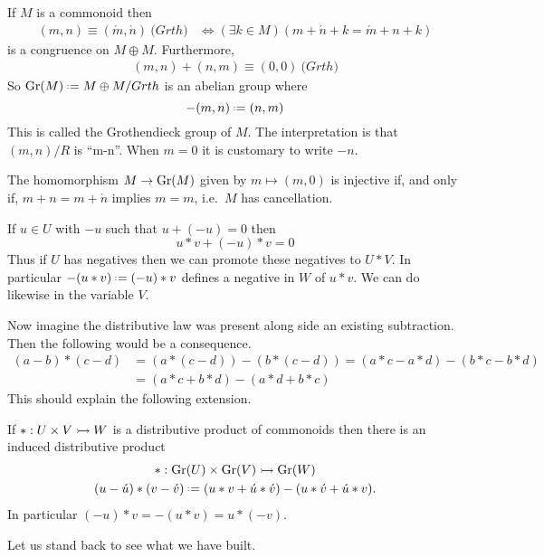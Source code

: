 \begin{theorem}
    If $M$ is a commonoid then 
    \begin{align*}
        (m,n) \equiv (\acute{m},\acute{n}) \pod{Grth} & \Leftrightarrow (\exists k\in M)(m+\acute{n}+k=\acute{m}+n+k)
    \end{align*}
    is a congruence on $M\oplus M$.  Furthermore,
    \begin{align*}
        (m,n)+(n,m) \equiv (0,0) \pod{Grth}
    \end{align*}
    So $\Gr(M)\defeq M\oplus M/Grth$ is an abelian group where 
    \[
        -(m,n)\defeq (n,m)
    \]
    This is called the Grothendieck group of $M$.
    The interpretation is that $(m,n)/R$ is ``m-n''.  When $m=0$ it is customary to write $-n$.

    The homomorphism $M\to \operatorname{Gr}(M)$ given by $m\mapsto (m,0)$ is injective 
    if, and only if, $m+n=m+\acute{n}$ implies $m=m$, i.e.\ $M$ has cancellation.
\end{theorem}

\begin{proposition}
    If $u\in U$ with $-u$ such that $u+(-u)=0$ then 
    \[
        u*v + (-u)*v =0
    \]
    Thus if $U$ has negatives then we can promote these negatives to $U*V$.
    In particular $-(u*v)\defeq (-u)*v$ defines a negative in $W$ of $u*v$.
    We can do likewise in the variable $V$.  
\end{proposition}
Now imagine the distributive law was present along side an existing subtraction.
Then the following would be a consequence.
\begin{align*}
    (a-b)*(c-d) & = (a*(c-d))-(b*(c-d))
        = (a*c-a*d)-(b*c-b*d)\\
        & =(a*c+b*d)-(a*d+b*c)
\end{align*}
This should explain the following extension.

\begin{corollary}
    If $*:U\times V\rightarrowtail W$ is a distributive product of commonoids then there is an 
    induced distributive product 
    \begin{gather*}
        * :\Gr(U)\times \Gr(V)\bmto \Gr(W)\\
        (u-\acute{u})*(v-\acute{v})
        \defeq (u*v+\acute{u}*\acute{v})-(u*\acute{v}+\acute{u}*v).
    \end{gather*}
    In particular $(-u)*v=-(u*v)=u*(-v)$.
\end{corollary}

Let us stand back to see what we have built.

